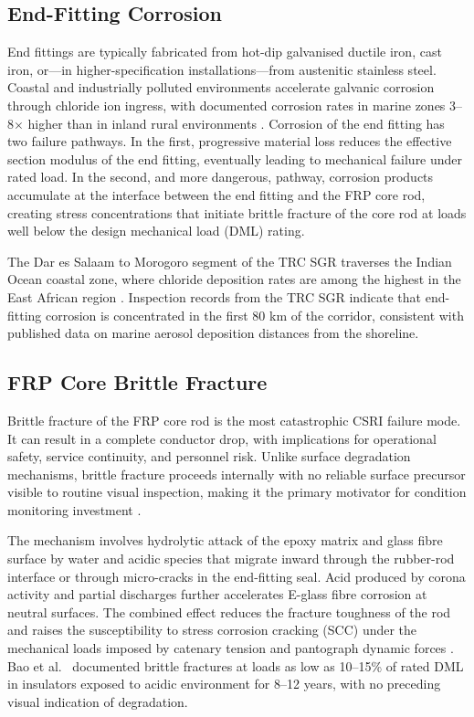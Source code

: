 \documentclass[preprint,12pt,3p]{elsarticle}
\begin{document}
\subsection{End-Fitting Corrosion}

End fittings are typically fabricated from hot-dip galvanised ductile
iron, cast iron, or---in higher-specification installations---from
austenitic stainless steel. Coastal and industrially polluted environments
accelerate galvanic corrosion through chloride ion ingress, with
documented corrosion rates in marine zones 3--8$\times$ higher than
in inland rural environments \cite{Papailiou2012}. Corrosion of the
end fitting has two failure pathways. In the first, progressive material
loss reduces the effective section modulus of the end fitting, eventually
leading to mechanical failure under rated load. In the second, and more
dangerous, pathway, corrosion products accumulate at the interface
between the end fitting and the FRP core rod, creating stress
concentrations that initiate brittle fracture of the core rod at
loads well below the design mechanical load (DML) rating.

The Dar es Salaam to Morogoro segment of the TRC SGR traverses the
Indian Ocean coastal zone, where chloride deposition rates are among the
highest in the East African region \cite{TRCInspection2025}. Inspection records
from the TRC SGR indicate that end-fitting corrosion is concentrated
in the first 80 km of the corridor, consistent with published data on
marine aerosol deposition distances from the shoreline.

\subsection{FRP Core Brittle Fracture}

Brittle fracture of the FRP core rod is the most catastrophic CSRI
failure mode. It can result in a complete conductor drop, with
implications for operational safety, service continuity, and personnel
risk. Unlike surface degradation mechanisms, brittle fracture proceeds
internally with no reliable surface precursor visible to routine visual
inspection, making it the primary motivator for condition monitoring
investment \cite{Papailiou2012, BrittleFracture2021}.

The mechanism involves hydrolytic attack of the epoxy matrix and
glass fibre surface by water and acidic species that migrate inward
through the rubber-rod interface or through micro-cracks in the
end-fitting seal. Acid produced by corona activity and partial
discharges further accelerates E-glass fibre corrosion at neutral
surfaces. The combined effect reduces the fracture toughness of the
rod and raises the susceptibility to stress corrosion cracking (SCC)
under the mechanical loads imposed by catenary tension and pantograph
dynamic forces \cite{Papailiou2012}. Bao et al.\ \cite{BrittleFracture2021}
documented brittle fractures at loads as low as 10--15\% of rated
DML in insulators exposed to acidic environment for 8--12 years,
with no preceding visual indication of degradation.
\end{document}
